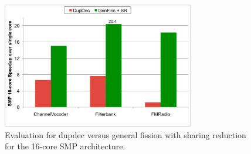 \begin{figure}[t]
\centering
\includegraphics[width=3.3in]{figures/smp-chart.pdf}
\caption[Comparing the fission techniques on the 16-core SMP.]{
  Evaluation for dupdec versus general fission with sharing reduction
  for the 16-core SMP architecture.  \label{fig:smp-chart}}
\end{figure}

